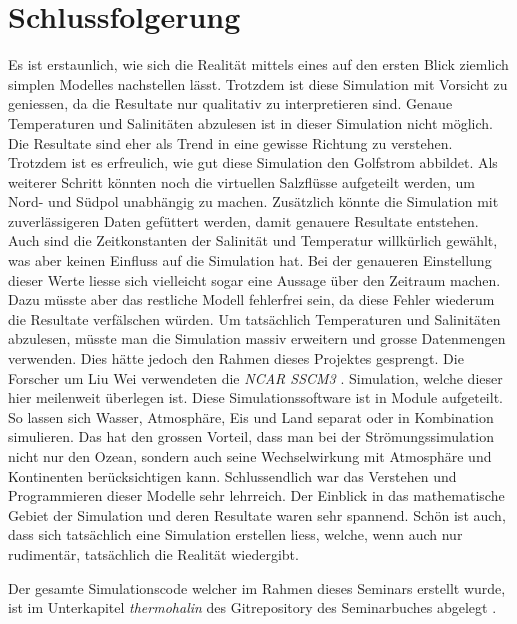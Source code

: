 \section{Schlussfolgerung}

Es ist erstaunlich, wie sich die Realität mittels eines auf den ersten Blick ziemlich simplen Modelles nachstellen lässt. Trotzdem ist diese Simulation mit Vorsicht zu geniessen, da die Resultate nur qualitativ zu interpretieren sind. Genaue Temperaturen und Salinitäten abzulesen ist in dieser Simulation nicht möglich. Die Resultate sind eher als Trend in eine gewisse Richtung zu verstehen. Trotzdem ist es erfreulich, wie gut diese Simulation den Golfstrom abbildet. 
Als weiterer Schritt könnten noch die virtuellen Salzflüsse aufgeteilt werden, um Nord- und Südpol unabhängig zu machen. Zusätzlich könnte die Simulation mit zuverlässigeren Daten gefüttert werden, damit genauere Resultate entstehen. Auch sind die Zeitkonstanten der Salinität und Temperatur willkürlich gewählt, was aber keinen Einfluss auf die Simulation hat. Bei der genaueren Einstellung dieser Werte liesse sich vielleicht sogar eine Aussage über den Zeitraum machen. Dazu müsste aber das restliche Modell fehlerfrei sein, da diese Fehler wiederum die Resultate verfälschen würden.
Um tatsächlich Temperaturen und Salinitäten abzulesen, müsste man die Simulation massiv erweitern und grosse Datenmengen verwenden. Dies hätte jedoch den Rahmen dieses Projektes gesprengt. 
Die Forscher um Liu Wei \cite{thermohalin:liuwei} verwendeten die {\em NCAR SSCM3} \cite{thermohalin:sim}. Simulation, welche dieser hier meilenweit überlegen ist. Diese Simulationssoftware ist in Module aufgeteilt. So lassen sich Wasser, Atmosphäre, Eis und Land separat oder in Kombination simulieren. Das hat den grossen Vorteil, dass man bei der Strömungssimulation nicht nur den Ozean, sondern auch seine Wechselwirkung mit Atmosphäre und Kontinenten berücksichtigen kann. 
Schlussendlich war das Verstehen und Programmieren dieser Modelle sehr lehrreich. Der Einblick in das mathematische Gebiet der Simulation und deren Resultate waren sehr spannend. Schön ist auch, dass sich tatsächlich eine Simulation erstellen liess, welche, wenn auch nur rudimentär, tatsächlich die Realität wiedergibt.

Der gesamte Simulationscode welcher im Rahmen dieses Seminars erstellt wurde, ist im Unterkapitel {\em thermohalin} des Gitrepository des Seminarbuches abgelegt \cite{thermohalin:gitrepo-klimawandel}.
